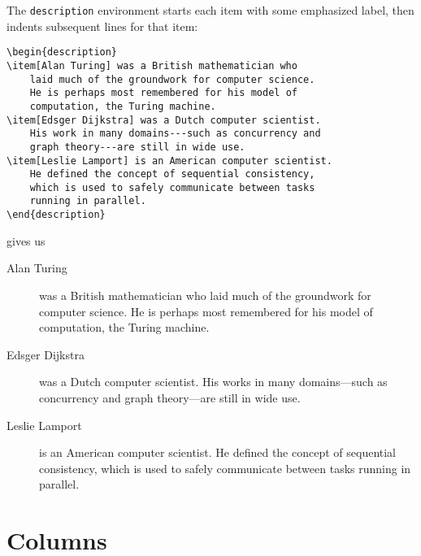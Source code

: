 \bigskip
\noindent The \texttt{description} environment starts each item with some
emphasized label,
then indents subsequent lines for that item:
\begin{leftfigure}
\begin{lstlisting}
\begin{description}
\item[Alan Turing] was a British mathematician who
    laid much of the groundwork for computer science.
    He is perhaps most remembered for his model of
    computation, the Turing machine.
\item[Edsger Dijkstra] was a Dutch computer scientist.
    His work in many domains---such as concurrency and
    graph theory---are still in wide use.
\item[Leslie Lamport] is an American computer scientist.
    He defined the concept of sequential consistency,
    which is used to safely communicate between tasks
    running in parallel.
\end{description}
\end{lstlisting}
\end{leftfigure}
gives us
\begin{leftfigure}
\lm%
\begin{description}
\item[\lm Alan Turing] was a British mathematician who
    laid much of the groundwork for computer science.
    He is perhaps most remembered for his model of computation,
    the Turing machine.
\item[\lm Edsger Dijkstra] was a Dutch computer scientist.
    His works in many domains---such as concurrency and
    graph theory---are still in wide use.
\item[\lm Leslie Lamport] is an American computer scientist.
    He defined the concept of sequential consistency,
    which is used to safely communicate between tasks
    running in parallel.
\end{description}
\end{leftfigure}

\section{Columns}

